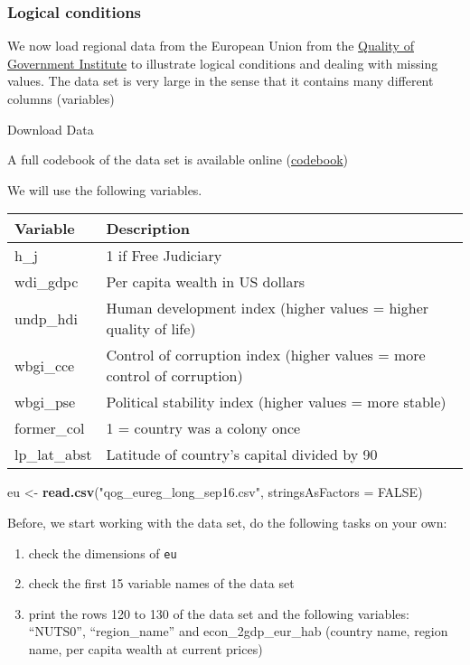 \documentclass[]{article}
\newenvironment{Shaded}{\begin{snugshade}}{\end{snugshade}}
\newcommand{\DataTypeTok}[1]{\textcolor[rgb]{0.13,0.29,0.53}{#1}}
\newcommand{\KeywordTok}[1]{\textcolor[rgb]{0.13,0.29,0.53}{\textbf{#1}}}
\newcommand{\NormalTok}[1]{#1}
\newcommand{\OtherTok}[1]{\textcolor[rgb]{0.56,0.35,0.01}{#1}}
\newcommand{\StringTok}[1]{\textcolor[rgb]{0.31,0.60,0.02}{#1}}
\providecommand{\tightlist}{%
  \setlength{\itemsep}{0pt}\setlength{\parskip}{0pt}}
\begin{document}
\hypertarget{logical-conditions}{%
\subsubsection{Logical conditions}\label{logical-conditions}}

We now load regional data from the European Union from the \href{http://qog.pol.gu.se/}{Quality of Government Institute} to illustrate logical conditions and dealing with missing values. The data set is very large in the sense that it contains many different columns (variables)

Download Data

A full codebook of the data set is available online (\href{https://www.qogdata.pol.gu.se/data/qog_eureg_sep16.pdf}{codebook})

We will use the following variables.

\begin{tabular}{l|l}
\hline
Variable & Description\\
\hline
h\_j & 1 if Free Judiciary\\
\hline
wdi\_gdpc & Per capita wealth in US dollars\\
\hline
undp\_hdi & Human development index (higher values = higher quality of life)\\
\hline
wbgi\_cce & Control of corruption index (higher values = more control of corruption)\\
\hline
wbgi\_pse & Political stability index (higher values = more stable)\\
\hline
former\_col & 1 = country was a colony once\\
\hline
lp\_lat\_abst & Latitude of country's capital divided by 90\\
\hline
\end{tabular}

\begin{Shaded}
\begin{Highlighting}[]
\NormalTok{eu <-}\StringTok{ }\KeywordTok{read.csv}\NormalTok{(}\StringTok{"qog_eureg_long_sep16.csv"}\NormalTok{, }\DataTypeTok{stringsAsFactors =} \OtherTok{FALSE}\NormalTok{)}
\end{Highlighting}
\end{Shaded}

Before, we start working with the data set, do the following tasks on your own:

\begin{enumerate}
\def\labelenumi{\arabic{enumi}.}
\tightlist
\item
  check the dimensions of \texttt{eu}
\item
  check the first 15 variable names of the data set
\item
  print the rows 120 to 130 of the data set and the following variables: ``NUTS0'', ``region\_name'' and econ\_2gdp\_eur\_hab (country name, region name, per capita wealth at current prices)
\end{enumerate}
\end{document}
